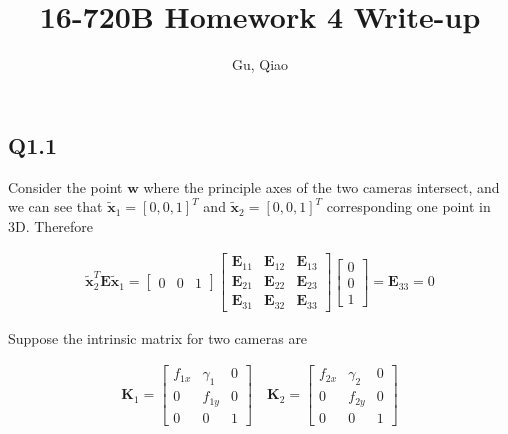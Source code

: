 \documentclass[11pt]{article}
\begin{document}
\author{Gu, Qiao}
\title{16-720B Homework 4 Write-up}
\maketitle

\medskip

\subsection*{Q1.1}

\newcommand{\intrinsic}{\mathbf{K}}
\newcommand{\fundamental}{\mathbf{F}}
\newcommand{\essential}{\mathbf{E}}
\newcommand{\homox}{\tilde{\mathbf{x}}}

Consider the point $\mathbf{w}$ where the principle axes of the two cameras intersect, and we can see that $\homox_1=[0,0,1]^T$ and $\homox_2=[0,0,1]^T$ corresponding one point in 3D. Therefore

\begin{align}
    \homox_2^T \essential \homox_1 =
    \begin{bmatrix}
        0 & 0 & 1
    \end{bmatrix}
    \begin{bmatrix}
        \essential_{11} & \essential_{12} & \essential_{13} \\
        \essential_{21} & \essential_{22} & \essential_{23} \\
        \essential_{31} & \essential_{32} & \essential_{33}
    \end{bmatrix}
    \begin{bmatrix}
        0 \\ 0 \\ 1
    \end{bmatrix}
    = \essential_{33} = 0
\end{align}

Suppose the intrinsic matrix for two cameras are

\begin{align}
    \intrinsic_1 =
    \begin{bmatrix}
        f_{1x} & \gamma_1 & 0 \\
        0 & f_{1y} & 0 \\
        0 & 0 & 1
    \end{bmatrix}
    \quad
    \intrinsic_2 =
    \begin{bmatrix}
        f_{2x} & \gamma_2 & 0 \\
        0 & f_{2y} & 0 \\
        0 & 0 & 1
    \end{bmatrix}
\end{align}
\end{document}
